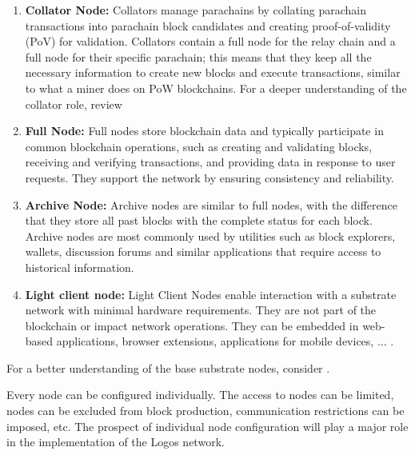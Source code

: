 \documentclass[]{article}
\begin{document}
\begin{enumerate}[label=\textbullet]
	\item\textbf{Collator Node:} 
	Collators manage parachains by collating parachain transactions into parachain block candidates and creating proof-of-validity (PoV) for validation.
	Collators contain a full node for the relay chain and a full node for their specific parachain; this means that they keep all the necessary information to create new blocks and execute transactions, similar to what a miner does on PoW blockchains.
	For a deeper understanding of the collator role, review \cite{PolkadotDoc-collator}
	
	\item\textbf{Full Node:}
	Full nodes store blockchain data and typically participate in common blockchain operations, such as creating and validating blocks, receiving and verifying transactions, and providing data in response to user requests. 
	They support the network by ensuring consistency and reliability. 

	\item\textbf{Archive Node:} 
	Archive nodes are similar to full nodes, with the difference that they store all past blocks with the complete status for each block. 
	Archive nodes are most commonly used by utilities such as block explorers, wallets, discussion forums and similar applications that require access to historical information.     
	
	\item\textbf{Light client node:} 
    Light Client Nodes enable interaction with a substrate network with minimal hardware requirements. They are not part of the blockchain or impact network operations. 
    They can be embedded in web-based applications, browser extensions, applications for mobile devices, ... .      
\end{enumerate}
For a better understanding of the base substrate nodes, consider \cite{SubstrateDoc-node}.

Every node can be configured individually. 
The access to nodes can be limited, nodes can be excluded from block production, communication restrictions can be imposed, etc.
The prospect of individual node configuration will play a major role in the implementation of the Logos network.

\end{document}

